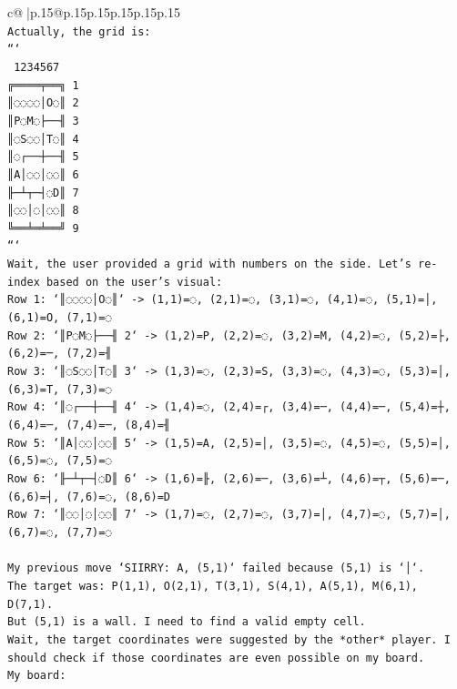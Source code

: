 \documentclass{article}
\begin{document}
{\begin{supertabular}{c@{$\;$}|p{.15\linewidth}@{}p{.15\linewidth}p{.15\linewidth}p{.15\linewidth}p{.15\linewidth}p{.15\linewidth}}
{{{\\ 
\texttt{Actually, the grid is:} \\
\texttt{```} \\
\texttt{ 1234567} \\
\texttt{╔════╤══╗ 1} \\
\texttt{║◌◌◌◌│O◌║ 2} \\
\texttt{║P◌M◌├──╢ 3} \\
\texttt{║◌S◌◌│T◌║ 4} \\
\texttt{║◌┌──┼──╢ 5} \\
\texttt{║A│◌◌│◌◌║ 6} \\
\texttt{╟─┴┬─┤◌D║ 7} \\
\texttt{║◌◌│◌│◌◌║ 8} \\
\texttt{╚══╧═╧══╝ 9} \\
\texttt{```} \\
\texttt{Wait, the user provided a grid with numbers on the side. Let's re{-}index based on the user's visual:} \\
\texttt{Row 1: `║◌◌◌◌│O◌║` {-}> (1,1)=◌, (2,1)=◌, (3,1)=◌, (4,1)=◌, (5,1)=│, (6,1)=O, (7,1)=◌} \\
\texttt{Row 2: `║P◌M◌├──╢ 2` {-}> (1,2)=P, (2,2)=◌, (3,2)=M, (4,2)=◌, (5,2)=├, (6,2)=─, (7,2)=╢} \\
\texttt{Row 3: `║◌S◌◌│T◌║ 3` {-}> (1,3)=◌, (2,3)=S, (3,3)=◌, (4,3)=◌, (5,3)=│, (6,3)=T, (7,3)=◌} \\
\texttt{Row 4: `║◌┌──┼──╢ 4` {-}> (1,4)=◌, (2,4)=┌, (3,4)=─, (4,4)=─, (5,4)=┼, (6,4)=─, (7,4)=─, (8,4)=╢} \\
\texttt{Row 5: `║A│◌◌│◌◌║ 5` {-}> (1,5)=A, (2,5)=│, (3,5)=◌, (4,5)=◌, (5,5)=│, (6,5)=◌, (7,5)=◌} \\
\texttt{Row 6: `╟─┴┬─┤◌D║ 6` {-}> (1,6)=╟, (2,6)=─, (3,6)=┴, (4,6)=┬, (5,6)=─, (6,6)=┤, (7,6)=◌, (8,6)=D} \\
\texttt{Row 7: `║◌◌│◌│◌◌║ 7` {-}> (1,7)=◌, (2,7)=◌, (3,7)=│, (4,7)=◌, (5,7)=│, (6,7)=◌, (7,7)=◌} \\
\\ 
\texttt{My previous move `SIIRRY: A, (5,1)` failed because (5,1) is `│`.} \\
\texttt{The target was: P(1,1), O(2,1), T(3,1), S(4,1), A(5,1), M(6,1), D(7,1).} \\
\texttt{But (5,1) is a wall. I need to find a valid empty cell.} \\
\texttt{Wait, the target coordinates were suggested by the *other* player. I should check if those coordinates are even possible on my board.} \\
\texttt{My board:} \\
}}}
\end{supertabular}}
\end{document}
